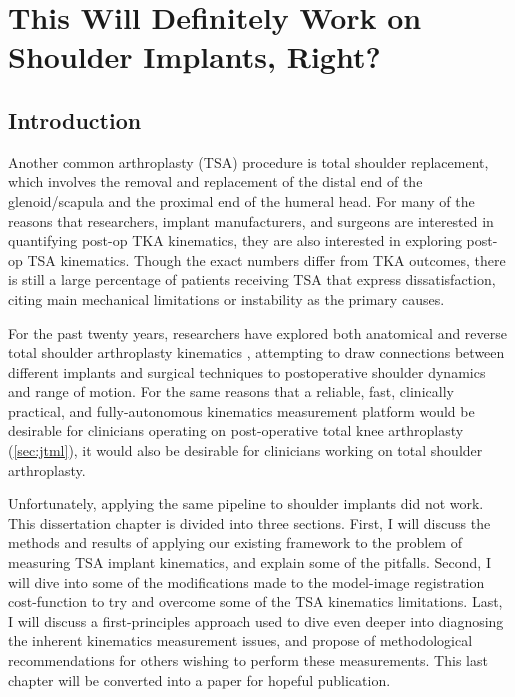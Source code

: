 \chapter{This Will Definitely Work on Shoulder Implants, Right?\protect\footnotemark}

\section{Introduction}
Another common arthroplasty (TSA) procedure is total shoulder replacement, which involves the removal and replacement of the distal end of the glenoid/scapula and the proximal end of the humeral head.
For many of the reasons that researchers, implant manufacturers, and surgeons are interested in quantifying post-op TKA kinematics, they are also interested in exploring post-op TSA kinematics.
Though the exact numbers differ from TKA outcomes, there is still a large percentage of patients receiving TSA that express dissatisfaction, citing main mechanical limitations or instability as the primary causes.

For the past twenty years, researchers have explored both anatomical and reverse total shoulder arthroplasty kinematics \cite{kijimaVivo3dimensionalAnalysis2015,matsukiVivo3DAnalysis2014,matsukiDynamicVivoGlenohumeral2012,sugiComparingVivoThreedimensional2021,burtonFullyAutomaticTracking2023}, attempting to draw connections between different implants and surgical techniques to postoperative shoulder dynamics and range of motion.
For the same reasons that a reliable, fast, clinically practical, and fully-autonomous kinematics measurement platform would be desirable for clinicians operating on post-operative total knee arthroplasty (\cref{sec:jtml}), it would also be desirable for clinicians working on total shoulder arthroplasty.

Unfortunately, applying the same pipeline to shoulder implants did not work.
This dissertation chapter is divided into three sections.
First, I will discuss the methods and results of applying our existing framework to the problem of measuring TSA implant kinematics, and explain some of the pitfalls.
Second, I will dive into some of the modifications made to the model-image registration cost-function to try and overcome some of the TSA kinematics limitations.
Last, I will discuss a first-principles approach used to dive even deeper into diagnosing the inherent kinematics measurement issues, and propose of methodological recommendations for others wishing to perform these measurements. This last chapter will be converted into a paper for hopeful publication.


